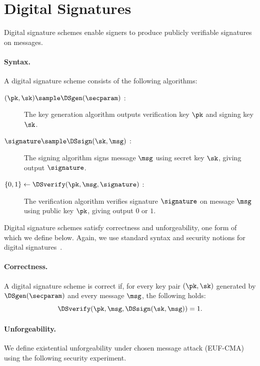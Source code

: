 \section{Digital Signatures}\label{sec:prelims-signatures}

Digital signature schemes enable signers to produce publicly verifiable
signatures on messages.

\paragraph{Syntax.} A digital signature scheme consists of the following
algorithms:

\begin{description}

  \item[$(\pk,\sk) \sample \DSgen(\secparam)$ : ] The key generation algorithm
    outputs verification key $\pk$ and signing key $\sk$.

  \item[$\signature \sample \DSsign(\sk, \msg)$ : ] The signing algorithm signs
    message $\msg$ using secret key $\sk$, giving output $\signature$.

  \item[$\{0,1\} \leftarrow \DSverify(\pk,\msg,\signature)$ : ] The
    verification algorithm verifies signature $\signature$ on message $\msg$
    using public key $\pk$, giving output $0$ or $1$.

\end{description}

Digital signature schemes satisfy correctness and unforgeability, one form of
which we define below. Again, we use standard syntax and security notions for
digital signatures~\cite{KatLin14}.

\paragraph{Correctness.} A digital signature scheme is correct if, for every
key pair $(\pk,\sk)$ generated by $\DSgen(\secparam)$ and every message $\msg$,
the following holds:
%
\begin{equation*}
%
  \DSverify(\pk, \msg, \DSsign(\sk, \msg)) = 1.
%
\end{equation*}
%

\paragraph{Unforgeability.} We define existential unforgeability under chosen
message attack (EUF-CMA) using the following security experiment.

